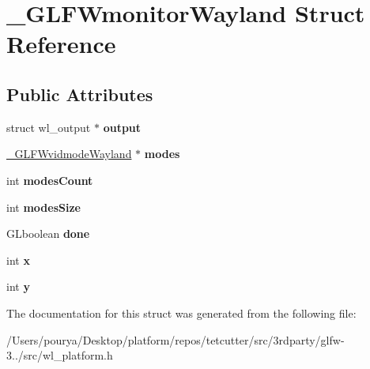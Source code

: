 \hypertarget{struct__GLFWmonitorWayland}{}\section{\+\_\+\+G\+L\+F\+Wmonitor\+Wayland Struct Reference}
\label{struct__GLFWmonitorWayland}
\subsection*{Public Attributes}
\begin{DoxyCompactItemize}
\item 
\hypertarget{struct__GLFWmonitorWayland_a2c736144d989a2fbc3a1eb6088ee9705}{}struct wl\+\_\+output $\ast$ {\bfseries output}\label{struct__GLFWmonitorWayland_a2c736144d989a2fbc3a1eb6088ee9705}

\item 
\hypertarget{struct__GLFWmonitorWayland_ae0e25b3acc1f46642d88225a52a05755}{}\hyperlink{struct__GLFWvidmodeWayland}{\+\_\+\+G\+L\+F\+Wvidmode\+Wayland} $\ast$ {\bfseries modes}\label{struct__GLFWmonitorWayland_ae0e25b3acc1f46642d88225a52a05755}

\item 
\hypertarget{struct__GLFWmonitorWayland_a8ee8a0d4bfe772091c46323d9ab61b03}{}int {\bfseries modes\+Count}\label{struct__GLFWmonitorWayland_a8ee8a0d4bfe772091c46323d9ab61b03}

\item 
\hypertarget{struct__GLFWmonitorWayland_a7e8d813895726a6c3fa17d54ec47a7ad}{}int {\bfseries modes\+Size}\label{struct__GLFWmonitorWayland_a7e8d813895726a6c3fa17d54ec47a7ad}

\item 
\hypertarget{struct__GLFWmonitorWayland_a859c7ed112e0202f1fcf3ef1879f735c}{}G\+Lboolean {\bfseries done}\label{struct__GLFWmonitorWayland_a859c7ed112e0202f1fcf3ef1879f735c}

\item 
\hypertarget{struct__GLFWmonitorWayland_a5f0f991409f35f64ba5ba68f80f2aa45}{}int {\bfseries x}\label{struct__GLFWmonitorWayland_a5f0f991409f35f64ba5ba68f80f2aa45}

\item 
\hypertarget{struct__GLFWmonitorWayland_a3e64b76803000be41abacc0045486cda}{}int {\bfseries y}\label{struct__GLFWmonitorWayland_a3e64b76803000be41abacc0045486cda}

\end{DoxyCompactItemize}


The documentation for this struct was generated from the following file\+:\begin{DoxyCompactItemize}
\item 
/\+Users/pourya/\+Desktop/platform/repos/tetcutter/src/3rdparty/glfw-\/3../src/wl\+\_\+platform.\+h\end{DoxyCompactItemize}
